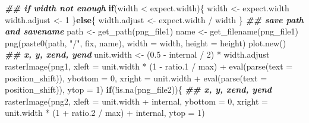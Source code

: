 \documentclass[
]{article}
\newenvironment{Shaded}{\begin{snugshade}}{\end{snugshade}}
\newcommand{\AttributeTok}[1]{\textcolor[rgb]{0.77,0.63,0.00}{#1}}
\newcommand{\ControlFlowTok}[1]{\textcolor[rgb]{0.13,0.29,0.53}{\textbf{#1}}}
\newcommand{\DecValTok}[1]{\textcolor[rgb]{0.00,0.00,0.81}{#1}}
\newcommand{\DocumentationTok}[1]{\textcolor[rgb]{0.56,0.35,0.01}{\textbf{\textit{#1}}}}
\newcommand{\FloatTok}[1]{\textcolor[rgb]{0.00,0.00,0.81}{#1}}
\newcommand{\FunctionTok}[1]{\textcolor[rgb]{0.00,0.00,0.00}{#1}}
\newcommand{\NormalTok}[1]{#1}
\newcommand{\OtherTok}[1]{\textcolor[rgb]{0.56,0.35,0.01}{#1}}
\newcommand{\SpecialCharTok}[1]{\textcolor[rgb]{0.00,0.00,0.00}{#1}}
\newcommand{\StringTok}[1]{\textcolor[rgb]{0.31,0.60,0.02}{#1}}
\begin{document}
\begin{Shaded}
\begin{Highlighting}[]
    \DocumentationTok{\#\# if width not enough}
    \ControlFlowTok{if}\NormalTok{(width }\SpecialCharTok{\textless{}}\NormalTok{ expect.width)\{}
\NormalTok{      width }\OtherTok{\textless{}{-}}\NormalTok{ expect.width}
\NormalTok{      width.adjust }\OtherTok{\textless{}{-}} \DecValTok{1}
\NormalTok{    \}}\ControlFlowTok{else}\NormalTok{\{}
\NormalTok{      width.adjust }\OtherTok{\textless{}{-}}\NormalTok{ expect.width }\SpecialCharTok{/}\NormalTok{ width}
\NormalTok{    \}}
    \DocumentationTok{\#\# save path and savename}
\NormalTok{    path }\OtherTok{\textless{}{-}} \FunctionTok{get\_path}\NormalTok{(png\_file1)}
\NormalTok{    name }\OtherTok{\textless{}{-}} \FunctionTok{get\_filename}\NormalTok{(png\_file1)}
    \FunctionTok{png}\NormalTok{(}\FunctionTok{paste0}\NormalTok{(path, }\StringTok{"/"}\NormalTok{, fix, name), }\AttributeTok{width =}\NormalTok{ width, }\AttributeTok{height =}\NormalTok{ height)}
    \FunctionTok{plot.new}\NormalTok{()}
    \DocumentationTok{\#\# x, y, xend, yend}
\NormalTok{    unit.width }\OtherTok{\textless{}{-}}\NormalTok{ (}\FloatTok{0.5} \SpecialCharTok{{-}}\NormalTok{ internal }\SpecialCharTok{/} \DecValTok{2}\NormalTok{) }\SpecialCharTok{*}\NormalTok{ width.adjust}
    \FunctionTok{rasterImage}\NormalTok{(png1,}
                \AttributeTok{xleft =}\NormalTok{ unit.width }\SpecialCharTok{*}\NormalTok{ (}\DecValTok{1} \SpecialCharTok{{-}}\NormalTok{ ratio}\FloatTok{.1} \SpecialCharTok{/}\NormalTok{ max) }\SpecialCharTok{+}
                  \FunctionTok{eval}\NormalTok{(}\FunctionTok{parse}\NormalTok{(}\AttributeTok{text =}\NormalTok{ position\_shift)),}
                \AttributeTok{ybottom =} \DecValTok{0}\NormalTok{,}
                \AttributeTok{xright =}\NormalTok{ unit.width }\SpecialCharTok{+} 
                  \FunctionTok{eval}\NormalTok{(}\FunctionTok{parse}\NormalTok{(}\AttributeTok{text =}\NormalTok{ position\_shift)),}
                \AttributeTok{ytop =} \DecValTok{1}\NormalTok{)}
    \ControlFlowTok{if}\NormalTok{(}\SpecialCharTok{!}\FunctionTok{is.na}\NormalTok{(png\_file2))\{}
      \DocumentationTok{\#\# x, y, xend, yend}
      \FunctionTok{rasterImage}\NormalTok{(png2,}
                  \AttributeTok{xleft =}\NormalTok{ unit.width }\SpecialCharTok{+}\NormalTok{ internal,}
                  \AttributeTok{ybottom =} \DecValTok{0}\NormalTok{,}
                  \AttributeTok{xright =}\NormalTok{ unit.width }\SpecialCharTok{*}\NormalTok{ (}\DecValTok{1} \SpecialCharTok{+}\NormalTok{ ratio}\FloatTok{.2} \SpecialCharTok{/}\NormalTok{ max) }\SpecialCharTok{+}\NormalTok{ internal, }
                  \AttributeTok{ytop =} \DecValTok{1}\NormalTok{)}

\end{Highlighting}
\end{Shaded}
\end{document}
